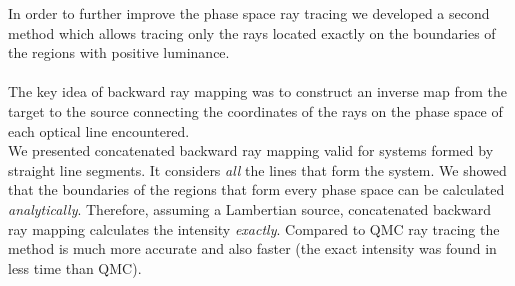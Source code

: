 In order to further improve the phase space ray tracing we developed a second method which allows tracing only the rays located exactly on the boundaries of the regions with positive luminance. 
\\ \\ \indent The key idea of backward ray mapping was to construct an inverse map from the target to the source connecting the coordinates of the rays on the phase space of each optical line encountered. \\ \indent 
We presented concatenated backward ray mapping valid for systems formed by straight line segments. It considers \textit{all} the lines that form the system. We showed that the boundaries of the regions that form every phase space can be calculated \textit{analytically}. Therefore, assuming a Lambertian source, concatenated backward ray mapping calculates the intensity \textit{exactly}. Compared to QMC ray tracing the method is much more accurate and also faster (the exact intensity was found in less time than QMC). 

